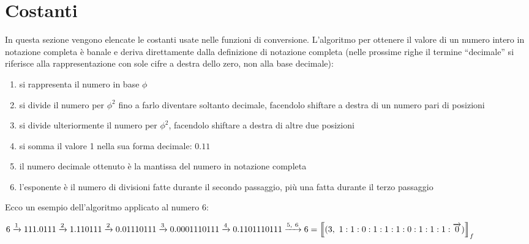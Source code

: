 \documentclass[Lau]{sapthesis}
\begin{document}
\section{Costanti}\label{costanti}
In questa sezione vengono elencate le costanti usate nelle funzioni di conversione. L'algoritmo per ottenere il valore di un numero intero in notazione completa è banale e deriva direttamente dalla definizione di notazione completa (nelle prossime righe il termine ``decimale'' si riferisce alla rappresentazione con sole cifre a destra dello zero, non alla base decimale):\\
\begin{enumerate}[(1)]
\item si rappresenta il numero in base $\phi$\\
\item si divide il numero per $\phi^2$ fino a farlo diventare soltanto decimale, facendolo shiftare a destra di un numero pari di posizioni\\
\item si divide ulteriormente il numero per $\phi^2$, facendolo shiftare a destra di altre due posizioni\\
\item si somma il valore 1 nella sua forma decimale: $0.11$\\
\item il numero decimale ottenuto è la mantissa del numero in notazione completa\\
\item l'esponente è il numero di divisioni fatte durante il secondo passaggio, più una fatta durante il terzo passaggio
\end{enumerate}
Ecco un esempio dell'algoritmo applicato al numero 6:
\begin{center}
$6 \xrightarrow{1} 111.0111 \xrightarrow{2} 1.110111 \xrightarrow{2} 0.01110111  \xrightarrow{3} 0.0001110111 \xrightarrow{4} 0.1101110111 \xrightarrow{5, \ 6} \newline\newline
6 = \left\llbracket (3, \ 1:1:0:1:1:1:0:1:1:1:\overrightarrow{0}) \right\rrbracket_f$
\end{center}
\end{document}

